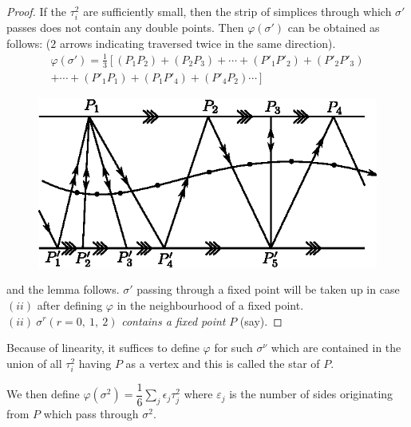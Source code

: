 \begin{proof} %
  If the $\tau^2_i$ are sufficiently small, then the strip of
  simplices through which $\sigma'$ passes does not contain any
  double points. Then $\varphi (\sigma')$ can be obtained as follows:
  ($2$ arrows indicating traversed twice in the same direction). 
  \begin{multline*}
  \varphi (\sigma') = \frac{1}{3} \left[ (P_1 P_2) + (P_2 P_3) +
    \cdots + (P'_1 P'_2) + (P'_2 P'_3)\right. \\
    \left.+ \cdots + (P'_1 P_1) + (P_1
    P'_4) + (P'_4 P_2) \cdots \right] 
  \end{multline*}
   \begin{figure}[H]
    \centerline{\includegraphics{vol9-figures/fig9-15.eps}}
  \end{figure}  
  and the lemma follows. $\sigma'$ passing through a fixed point will
  be taken up in case $(ii)$ after defining $\varphi$ in the
  neighbourhood of a fixed point. $(ii) ~ \sigma^r (r = 0, ~ 1, ~2)$
  \textit{contains a fixed point } $P$ (say). 
\end{proof}  
  
Because of linearity, it suffices to define $\varphi$ for such
$\sigma^\nu$ which are contained in the union of all $\tau^2_i$ having
$P$ as a vertex and this is called the star of $P$. 
  
We then define $\varphi (\sigma^2) = \dfrac{1}{6} \sum\limits_{j} \epsilon_j
\tau^2_j$ where $\varepsilon_j$ is the number of sides originating
from $P$ which pass through $\sigma^2$.\pageoriginale 
  
